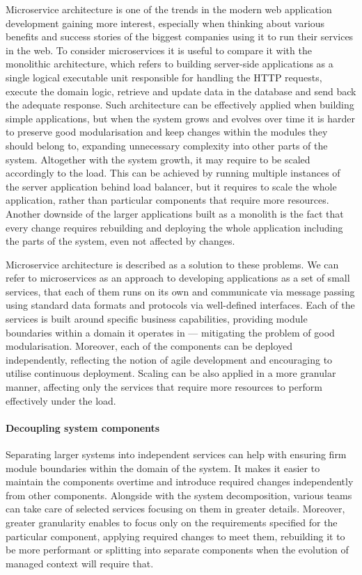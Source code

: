 Microservice architecture is one of the trends in the modern web application development gaining more interest, especially when thinking about various benefits and success stories of the biggest companies using it to run their services in the web. To consider microservices it is useful to compare it with the monolithic architecture, which refers to building server-side applications as a single logical executable unit responsible for handling the HTTP requests, execute the domain logic, retrieve and update data in the database and send back the adequate response. Such architecture can be effectively applied when building simple applications, but when the system grows and evolves over time it is harder to preserve good modularisation and keep changes within the modules they should belong to, expanding unnecessary complexity into other parts of the system. Altogether with the system growth, it may require to be scaled accordingly to the load. This can be achieved by running multiple instances of the server application behind load balancer, but it requires to scale the whole application, rather than particular components that require more resources. Another downside of the larger applications built as a monolith is the fact that every change requires rebuilding and deploying the whole application including the parts of the system, even not affected by changes.

Microservice architecture \cite{FowlerMicroservices} is described as a solution to these problems. We can refer to microservices as an approach to developing applications as a set of small services, that each of them runs on its own and communicate via message passing using standard data formats and protocols via well-defined interfaces. Each of the services is built around specific business capabilities, providing module boundaries within a domain it operates in --- mitigating the problem of good modularisation. Moreover, each of the components can be deployed independently, reflecting the notion of agile development and encouraging to utilise continuous deployment. Scaling can be also applied in a more granular manner, affecting only the services that require more resources to perform effectively under the load.

\paragraph{Decoupling system components}

Separating larger systems into independent services can help with ensuring firm module boundaries within the domain of the system. It makes it easier to maintain the components overtime and introduce required changes independently from other components. Alongside with the system decomposition, various teams can take care of selected services focusing on them in greater details. Moreover, greater granularity enables to focus only on the requirements specified for the particular component, applying required changes to meet them, rebuilding it to be more performant or splitting into separate components when the evolution of managed context will require that.

